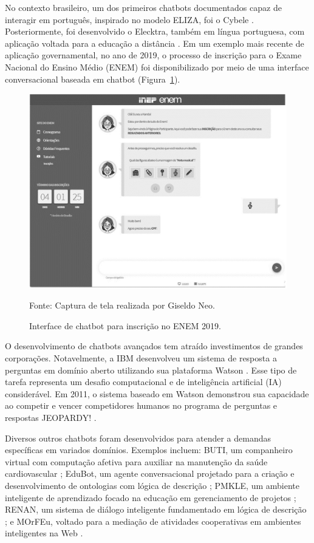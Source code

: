 \documentclass[14pt,a4paper,oneside]{book}
\begin{document}
No contexto brasileiro, um dos primeiros chatbots documentados capaz de interagir em português, inspirado no modelo ELIZA, foi o Cybele \cite{primo2001chatterbot}. Posteriormente, foi desenvolvido o Elecktra, também em língua portuguesa, com aplicação voltada para a educação a distância \cite{Leonhardt2003}. 
Em um exemplo mais recente de aplicação governamental, no ano de 2019, o processo de inscrição para o Exame Nacional do Ensino Médio (ENEM) foi disponibilizado por meio de uma interface conversacional baseada em chatbot (Figura~\ref{fig:enem}).

\begin{figure}
	\centering
	\caption{Interface de chatbot para inscrição no ENEM 2019.}
	\includegraphics[width=0.5\linewidth]{./fig/enem.png}
	\label{fig:enem}
	{\footnotesize 
	
	Fonte: Captura de tela realizada por Giseldo Neo.}
\end{figure}

O desenvolvimento de chatbots avançados tem atraído investimentos de grandes corporações. Notavelmente, a IBM desenvolveu um sistema de resposta a perguntas em domínio aberto utilizando sua plataforma Watson \cite{Ferrucci2012}. Esse tipo de tarefa representa um desafio computacional e de inteligência artificial (IA) considerável. Em 2011, o sistema baseado em Watson demonstrou sua capacidade ao competir e vencer competidores humanos no programa de perguntas e respostas JEOPARDY! \cite{Ferrucci2012}.

Diversos outros chatbots foram desenvolvidos para atender a demandas específicas em variados domínios. Exemplos incluem: BUTI, um companheiro virtual com computação afetiva para auxiliar na manutenção da saúde cardiovascular \cite{Junior2008}; EduBot, um agente conversacional projetado para a criação e desenvolvimento de ontologias com lógica de descrição \cite{Lima2017}; PMKLE, um ambiente inteligente de aprendizado focado na educação em gerenciamento de projetos \cite{Torreao2005}; RENAN, um sistema de diálogo inteligente fundamentado em lógica de descrição \cite{AZEVEDO2015}; e MOrFEu, voltado para a mediação de atividades cooperativas em ambientes inteligentes na Web \cite{Bada2012}.
\end{document}
